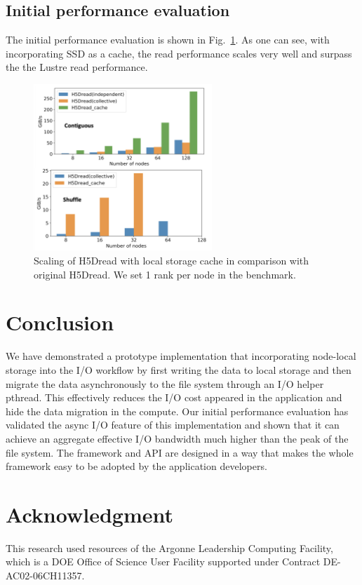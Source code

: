 \documentclass[aps, rmp, 11pt, notitlepage]{revtex4-1}
\begin{document}
\subsection{Initial performance evaluation}
The initial performance evaluation is shown in Fig.~\ref{fig:perf_read}. As one can see, with incorporating SSD as a cache, the read performance scales very well and surpass the the Lustre read performance. 
\begin{figure}[hbt]
\centering
\includegraphics[width=0.6\textwidth]{perf_read.png}
\caption{Scaling of H5Dread with local storage cache in comparison with original H5Dread. We set 1 rank per node in the benchmark.}\label{fig:perf_read}
\end{figure}
\section{Conclusion}
We have demonstrated a prototype implementation that incorporating node-local storage into the I/O workflow by first writing the data to local storage and then migrate the data asynchronously to the file system through an I/O helper pthread. This effectively reduces the I/O cost appeared in the application and hide the data migration in the compute. Our initial performance evaluation has validated the async I/O feature of this implementation and shown that it can achieve an aggregate effective I/O bandwidth much higher than the peak of the file system. The framework and API are designed in a way that makes the whole framework easy to be adopted by the application developers. 
\section*{Acknowledgment}
This research used resources of the Argonne Leadership Computing Facility, which is a DOE Office of Science User Facility supported under Contract DE-AC02-06CH11357.
\end{document}
